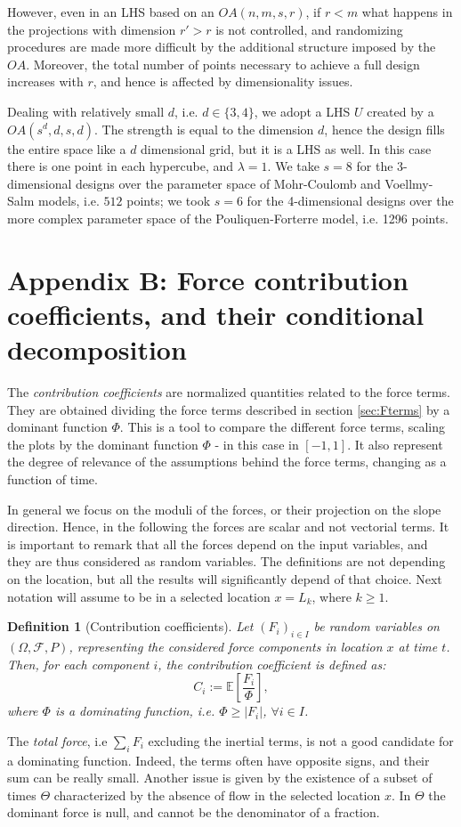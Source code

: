 \documentclass{article}
\newtheorem{definition}[theorem]{Definition}
\begin{document}
However, even in an LHS based on an $OA(n,m,s,r)$, if $r<m$ what happens in the projections with dimension $r'>r$ is not controlled, and randomizing procedures are made more difficult by the additional structure imposed by the $OA$. Moreover, the total number of points necessary to achieve a full design increases with $r$, and hence is affected by dimensionality issues.

Dealing with relatively small $d$, i.e. $d\in\{3,4\}$, we adopt a LHS $U$ created by a $OA(s^d,d,s,d)$. The strength is equal to the dimension $d$, hence the design fills the entire space like a $d$ dimensional grid, but it is a LHS as well. In this case there is one point in each hypercube, and $\lambda=1$. We take $s=8$ for the 3-dimensional designs over the parameter space of Mohr-Coulomb and Voellmy-Salm models, i.e. $512$ points; we took $s=6$ for the 4-dimensional designs over the more complex parameter space of the Pouliquen-Forterre model, i.e. 1296 points.

\section{Appendix B: Force contribution coefficients, and their conditional decomposition}
The \emph{contribution coefficients} are normalized quantities related to the force terms. They are obtained dividing the force terms described in section \ref{sec:Fterms} by a dominant function $\Phi$. This is a tool to compare the different force terms, scaling the plots by the dominant function $\Phi$ - in this case in $[-1,1]$. It also represent the degree of relevance of the assumptions behind the force terms, changing as a function of time.

In general we focus on the moduli of the forces, or their projection on the slope direction. Hence, in the following the forces are scalar and not vectorial terms. It is important to remark that all the forces depend on the input variables, and they are thus considered as random variables. The definitions are not depending on the location, but all the results will significantly depend of that choice. Next notation will assume to be in a selected location $x=L_k$, where $k\ge 1$.

\begin{definition}[Contribution coefficients]
Let $(F_i)_{i\in I}$ be random variables on $(\Omega, \mathcal F, P)$, representing the considered force components in location $x$ at time $t$. Then, for each component $i$, the contribution coefficient is defined as:
$$C_i:=\mathbb E\left[\frac{F_i}{\Phi}\right],$$
where $\Phi$ is a dominating function, i.e. $\Phi\ge |F_i|$, $\forall i\in I$.
\end{definition}
The \emph{total force}, i.e $\sum_i F_i$ excluding the inertial terms, is not a good candidate for a dominating function. Indeed, the terms often have opposite signs, and their sum can be really small. Another issue is given by the existence of a subset of times $\Theta$ characterized by the absence of flow in the selected location $x$. In $\Theta$ the dominant force is null, and cannot be the denominator of a fraction.
\end{document}
